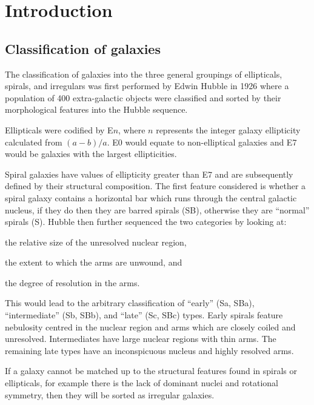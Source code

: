 \documentclass[12pt, twocolumn]{revtex4-1}    %
\begin{document}

\null\newpage
\null\newpage
\tableofcontents

\section{Introduction} 
\subsection{Classification of galaxies}
\noindent
The classification of galaxies into the three general groupings of ellipticals, spirals, and irregulars was first performed by Edwin Hubble in 1926 \citep{1926ApJ....64..321H} where a population of 400 extra-galactic objects were classified and sorted by their morphological features into the Hubble sequence.

Ellipticals were codified by E$n$, where $n$ represents the integer galaxy ellipticity calculated from $(a-b)/a$. E0 would equate to non-elliptical galaxies and E7 would be galaxies with the largest ellipticities. 

Spiral galaxies have values of ellipticity greater than E7 and are subsequently defined by their structural composition. The first feature considered is whether a spiral galaxy contains a horizontal bar which runs through the central galactic nucleus, if they do then they are barred spirals (SB), otherwise they are ``normal'' spirals (S). Hubble then further sequenced the two categories by looking at: 
\begin {enumerate*} [label=\itshape\alph*\upshape)]
\item the relative size of the unresolved nuclear region, \item the extent to which the arms are unwound, and \item the degree of resolution in the arms. 
\end {enumerate*} 
This would lead to the arbitrary classification of ``early'' (Sa, SBa), ``intermediate'' (Sb, SBb), and ``late'' (Sc, SBc) types. Early spirals feature nebulosity centred in the nuclear region and arms which are closely coiled and unresolved. Intermediates have large nuclear regions with thin arms. The remaining late types have an inconspicuous nucleus and highly resolved arms.  

If a galaxy cannot be matched up to the structural features found in spirals or ellipticals, for example there is the lack of dominant nuclei and rotational symmetry, then they will be sorted as irregular galaxies.
\end{document}
